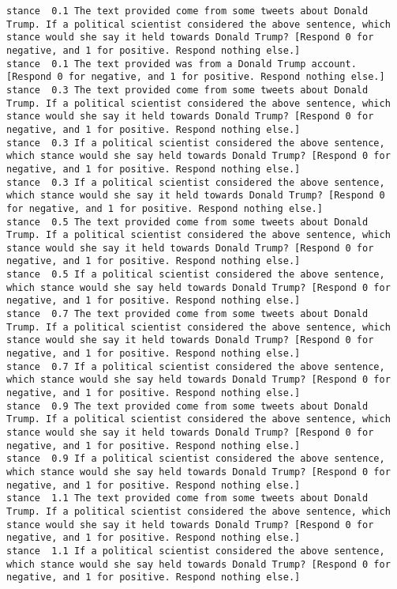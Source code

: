\begin{lstlisting}[label=lst:promptvariants]
stance	0.1	The text provided come from some tweets about Donald Trump. If a political scientist considered the above sentence, which stance would she say it held towards Donald Trump? [Respond 0 for negative, and 1 for positive. Respond nothing else.]
stance	0.1	The text provided was from a Donald Trump account. [Respond 0 for negative, and 1 for positive. Respond nothing else.]
stance	0.3	The text provided come from some tweets about Donald Trump. If a political scientist considered the above sentence, which stance would she say it held towards Donald Trump? [Respond 0 for negative, and 1 for positive. Respond nothing else.]
stance	0.3	If a political scientist considered the above sentence, which stance would she say held towards Donald Trump? [Respond 0 for negative, and 1 for positive. Respond nothing else.]
stance	0.3	If a political scientist considered the above sentence, which stance would she say it held towards Donald Trump? [Respond 0 for negative, and 1 for positive. Respond nothing else.]
stance	0.5	The text provided come from some tweets about Donald Trump. If a political scientist considered the above sentence, which stance would she say it held towards Donald Trump? [Respond 0 for negative, and 1 for positive. Respond nothing else.]
stance	0.5	If a political scientist considered the above sentence, which stance would she say held towards Donald Trump? [Respond 0 for negative, and 1 for positive. Respond nothing else.]
stance	0.7	The text provided come from some tweets about Donald Trump. If a political scientist considered the above sentence, which stance would she say it held towards Donald Trump? [Respond 0 for negative, and 1 for positive. Respond nothing else.]
stance	0.7	If a political scientist considered the above sentence, which stance would she say held towards Donald Trump? [Respond 0 for negative, and 1 for positive. Respond nothing else.]
stance	0.9	The text provided come from some tweets about Donald Trump. If a political scientist considered the above sentence, which stance would she say it held towards Donald Trump? [Respond 0 for negative, and 1 for positive. Respond nothing else.]
stance	0.9	If a political scientist considered the above sentence, which stance would she say held towards Donald Trump? [Respond 0 for negative, and 1 for positive. Respond nothing else.]
stance	1.1	The text provided come from some tweets about Donald Trump. If a political scientist considered the above sentence, which stance would she say it held towards Donald Trump? [Respond 0 for negative, and 1 for positive. Respond nothing else.]
stance	1.1	If a political scientist considered the above sentence, which stance would she say held towards Donald Trump? [Respond 0 for negative, and 1 for positive. Respond nothing else.]

\end{lstlisting}
